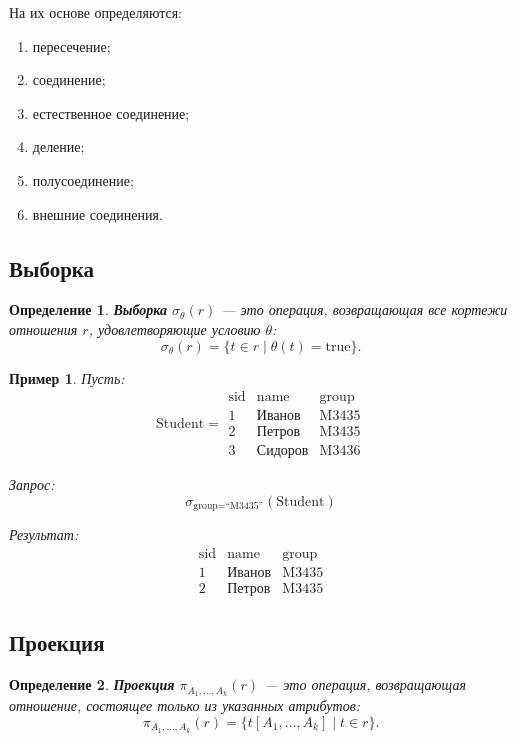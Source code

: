 \documentclass[12pt,a4paper]{article}
\newtheorem{definition}{Определение}[section]
\newtheorem{example}{Пример}[section]
\theoremstyle{remark}
\begin{document}
На их основе определяются:
\begin{enumerate}
    \item пересечение;
    \item соединение;
    \item естественное соединение;
    \item деление;
    \item полусоединение;
    \item внешние соединения.
\end{enumerate}

\subsection{Выборка}

\begin{definition}
\textbf{Выборка} $\sigma_\theta(r)$ --- это операция, возвращающая все кортежи отношения $r$, удовлетворяющие условию $\theta$:
\[
\sigma_\theta(r) = \{t \in r \mid \theta(t) = \text{true}\}.
\]
\end{definition}

\begin{example}
Пусть:
\[
\text{Student} =
\begin{array}{c|c|c}
\text{sid} & \text{name} & \text{group} \\
\hline
1 & \text{Иванов} & \text{M3435} \\
2 & \text{Петров} & \text{M3435} \\
3 & \text{Сидоров} & \text{M3436}
\end{array}
\]

Запрос:
\[
\sigma_{\text{group} = \text{``M3435''}}(\text{Student})
\]

Результат:
\[
\begin{array}{c|c|c}
\text{sid} & \text{name} & \text{group} \\
\hline
1 & \text{Иванов} & \text{M3435} \\
2 & \text{Петров} & \text{M3435}
\end{array}
\]
\end{example}

\subsection{Проекция}

\begin{definition}
\textbf{Проекция} $\pi_{A_1,\dots,A_k}(r)$ --- это операция, возвращающая отношение, состоящее только из указанных атрибутов:
\[
\pi_{A_1,\dots,A_k}(r) =
\{t[A_1,\dots,A_k] \mid t \in r\}.
\]
\end{definition}
\end{document}
